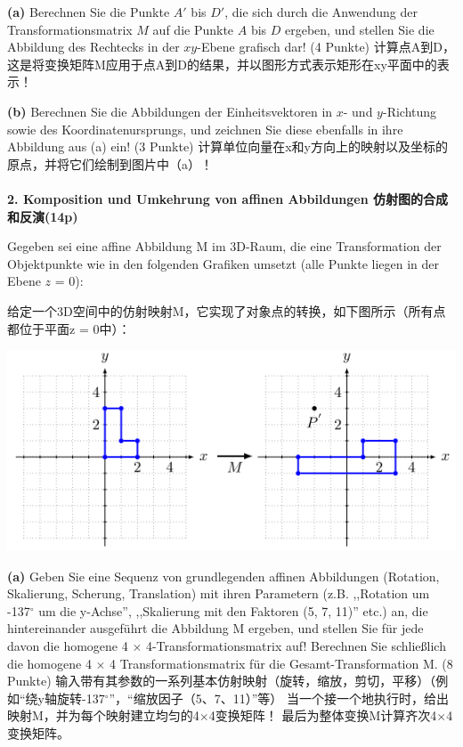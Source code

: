 \documentclass[fleqn]{article}
\begin{document}
\indent\textbf{(a)} Berechnen Sie die Punkte $A'$ bis $D'$, die sich durch die Anwendung der Transformationsmatrix $M$ auf die Punkte $A$ bis $D$ ergeben, und stellen Sie die Abbildung des Rechtecks in der $xy$-Ebene grafisch dar! (4 Punkte)
计算点A到D，这是将变换矩阵M应用于点A到D的结果，并以图形方式表示矩形在xy平面中的表示！

\indent\textbf{(b)} Berechnen Sie die Abbildungen der Einheitsvektoren in $x$- und $y$-Richtung sowie des Koordinatenursprungs, und zeichnen Sie diese ebenfalls in ihre Abbildung aus (a) ein! (3 Punkte)
计算单位向量在x和y方向上的映射以及坐标的原点，并将它们绘制到图片中（a）！
\\
\\
\noindent\textbf{2. Komposition und Umkehrung von affinen Abbildungen 仿射图的合成和反演(14p)}

Gegeben sei eine affine Abbildung M im 3D-Raum, die eine Transformation der Objektpunkte wie in den folgenden Grafiken umsetzt (alle Punkte liegen in der Ebene $z$ = 0):

给定一个3D空间中的仿射映射M，它实现了对象点的转换，如下图所示（所有点都位于平面z = 0中）：

\begin{center}
    \includegraphics[scale=0.6]{19.png}
\end{center}

\indent\textbf{(a)} Geben Sie eine Sequenz von grundlegenden affinen Abbildungen 
(Rotation, Skalierung, Scherung, Translation) mit ihren Parametern
 (z.B. ,,Rotation um -137$^\circ$ um die y-Achse'',
  ,,Skalierung mit den Faktoren (5, 7, 11)'' etc.) an,
   die hintereinander ausgeführt die Abbildung M ergeben,
   und stellen Sie für jede davon die homogene 4 $\times$ 4-Transformationsmatrix auf! 
   Berechnen Sie schließlich die homogene 4 $\times$ 4 Transformationsmatrix für die Gesamt-Transformation M. (8 Punkte)
   输入带有其参数的一系列基本仿射映射（旋转，缩放，剪切，平移）（例如“绕y轴旋转-137$^\circ$”，“缩放因子（5、7、11）”等） 当一个接一个地执行时，给出映射M，并为每个映射建立均匀的4$\times$4变换矩阵！ 最后为整体变换M计算齐次4$\times$4变换矩阵。
\end{document}
